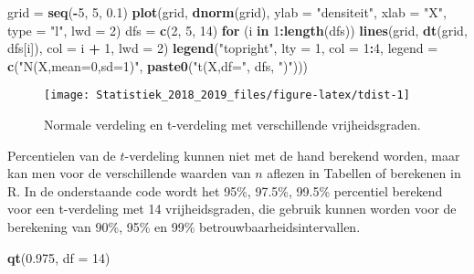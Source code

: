 \documentclass[12pt,dutch,coursenotes]{book}
\newenvironment{Shaded}{\begin{snugshade}}{\end{snugshade}}
\newcommand{\KeywordTok}[1]{\textcolor[rgb]{0.13,0.29,0.53}{\textbf{#1}}}
\newcommand{\DataTypeTok}[1]{\textcolor[rgb]{0.13,0.29,0.53}{#1}}
\newcommand{\DecValTok}[1]{\textcolor[rgb]{0.00,0.00,0.81}{#1}}
\newcommand{\FloatTok}[1]{\textcolor[rgb]{0.00,0.00,0.81}{#1}}
\newcommand{\StringTok}[1]{\textcolor[rgb]{0.31,0.60,0.02}{#1}}
\newcommand{\ControlFlowTok}[1]{\textcolor[rgb]{0.13,0.29,0.53}{\textbf{#1}}}
\newcommand{\OperatorTok}[1]{\textcolor[rgb]{0.81,0.36,0.00}{\textbf{#1}}}
\newcommand{\NormalTok}[1]{#1}
\theoremstyle{definition}
\theoremstyle{definition}
\theoremstyle{definition}
\theoremstyle{remark}
\begin{document}
\begin{Shaded}
\begin{Highlighting}[]
\NormalTok{grid =}\StringTok{ }\KeywordTok{seq}\NormalTok{(}\OperatorTok{-}\DecValTok{5}\NormalTok{, }\DecValTok{5}\NormalTok{, }\FloatTok{0.1}\NormalTok{)}
\KeywordTok{plot}\NormalTok{(grid, }\KeywordTok{dnorm}\NormalTok{(grid), }\DataTypeTok{ylab =} \StringTok{"densiteit"}\NormalTok{, }\DataTypeTok{xlab =} \StringTok{"X"}\NormalTok{, }
    \DataTypeTok{type =} \StringTok{"l"}\NormalTok{, }\DataTypeTok{lwd =} \DecValTok{2}\NormalTok{)}
\NormalTok{dfs =}\StringTok{ }\KeywordTok{c}\NormalTok{(}\DecValTok{2}\NormalTok{, }\DecValTok{5}\NormalTok{, }\DecValTok{14}\NormalTok{)}
\ControlFlowTok{for}\NormalTok{ (i }\ControlFlowTok{in} \DecValTok{1}\OperatorTok{:}\KeywordTok{length}\NormalTok{(dfs)) }\KeywordTok{lines}\NormalTok{(grid, }\KeywordTok{dt}\NormalTok{(grid, dfs[i]), }
    \DataTypeTok{col =}\NormalTok{ i }\OperatorTok{+}\StringTok{ }\DecValTok{1}\NormalTok{, }\DataTypeTok{lwd =} \DecValTok{2}\NormalTok{)}
\KeywordTok{legend}\NormalTok{(}\StringTok{"topright"}\NormalTok{, }\DataTypeTok{lty =} \DecValTok{1}\NormalTok{, }\DataTypeTok{col =} \DecValTok{1}\OperatorTok{:}\DecValTok{4}\NormalTok{, }\DataTypeTok{legend =} \KeywordTok{c}\NormalTok{(}\StringTok{"N(X,mean=0,sd=1)"}\NormalTok{, }
    \KeywordTok{paste0}\NormalTok{(}\StringTok{"t(X,df="}\NormalTok{, dfs, }\StringTok{")"}\NormalTok{)))}
\end{Highlighting}
\end{Shaded}

\begin{figure}

{\centering \texttt{[image: Statistiek\_2018\_2019\_files/figure-latex/tdist-1]} 

}

\caption{Normale verdeling en t-verdeling met verschillende vrijheidsgraden.}\label{fig:tdist}
\end{figure}

Percentielen van de \(t\)-verdeling kunnen niet met de hand berekend
worden, maar kan men voor de verschillende waarden van \(n\) aflezen in
Tabellen of berekenen in R. In de onderstaande code wordt het 95\%,
97.5\%, 99.5\% percentiel berekend voor een t-verdeling met 14
vrijheidsgraden, die gebruik kunnen worden voor de berekening van 90\%,
95\% en 99\% betrouwbaarheidsintervallen.

\begin{Shaded}
\begin{Highlighting}[]
\KeywordTok{qt}\NormalTok{(}\FloatTok{0.975}\NormalTok{, }\DataTypeTok{df =} \DecValTok{14}\NormalTok{)}
\end{Highlighting}
\end{Shaded}
\end{document}
